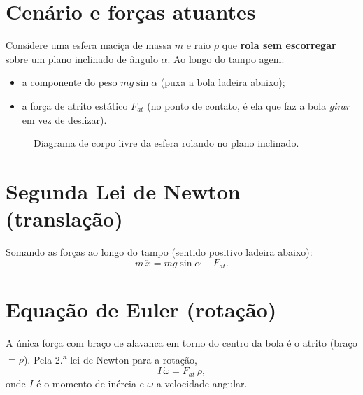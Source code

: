 \section{Cen\'ario e for\c{c}as atuantes}
Considere uma esfera maci\c{c}a de massa $m$ e raio $\rho$ que \textbf{rola sem
escorregar} sobre um plano inclinado de \^angulo $\alpha$. Ao longo do tampo agem:
\begin{itemize}[leftmargin=1.4em]
  \item a componente do peso $mg\sin\alpha$ (puxa a bola ladeira abaixo);
  \item a for\c{c}a de atrito est\'atico $F_{at}$ (no ponto de contato, \'e ela que
  faz a bola \emph{girar} em vez de deslizar).
\end{itemize}

\begin{figure}[h]\centering
{}
\caption{Diagrama de corpo livre da esfera rolando no plano inclinado.}
\label{fig:dcl}
\end{figure}

\section{Segunda Lei de Newton (transla\c{c}\~ao)}
Somando as for\c{c}as ao longo do tampo (sentido positivo ladeira abaixo):
\begin{equation}
m\,\ddot{x} = mg\sin\alpha - F_{at}.
\label{eq:newton}
\end{equation}

\section{Equa\c{c}\~ao de Euler (rota\c{c}\~ao)}
A \'unica for\c{c}a com bra\c{c}o de alavanca em torno do centro da bola \'e o
atrito (bra\c{c}o $=\rho$). Pela 2.\textsuperscript{a} lei de Newton para a
rota\c{c}\~ao,
\begin{equation}
I\,\dot{\omega} = F_{at}\,\rho,
\label{eq:euler}
\end{equation}
onde $I$ \'e o momento de in\'ercia e $\omega$ a velocidade angular.

